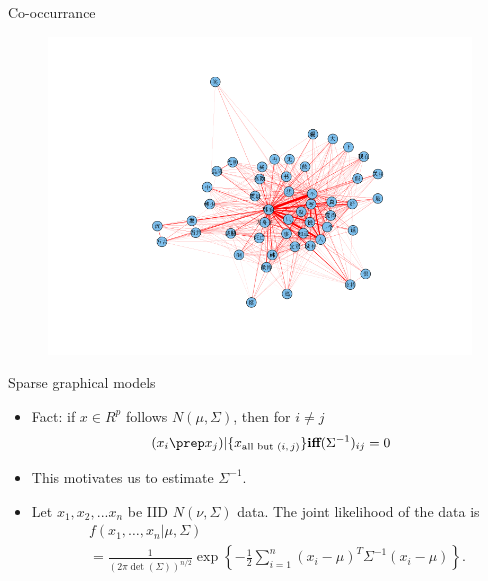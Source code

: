 \documentclass[12pt, trans]{beamer}
\newcommand{\1}[1]{{\mathbf 1}\left\{#1\right\}}        %
\def\lp{\left(}
\def\rp{\right)}
\begin{document}
\begin{frame}{Co-occurrance}

\begin{figure}
  \centering
  \includegraphics[height=0.9\textheight]{./../../coocurResults/cooccurNetwork.png} 
\end{figure}

\end{frame}

\begin{frame}[fragile]{Sparse graphical models}

\begin{itemize}[<+->]
\item Fact: if $x\in R^p$ follows $N(\mu,\Sigma)$, then for $i\ne j$
\begin{align*}
\label{eq: condIndpt}
(x_i \prep x_j )| \{x_{\text{all but $(i,j)$}}\} \textbf{iff} (\Sigma^{-1})_{ij}=0
\end{align*}
\item This motivates us to estimate $\Sigma^{-1}$.
\item Let $x_1,x_2,...x_n$ be IID $N(\nu,\Sigma)$ data. The joint likelihood of the data is
\begin{align*}
& f(x_1, \dots, x_n|\mu,\Sigma) 
\\&= \frac{1}{(2\pi \det\lp \Sigma\rp)^{n/2}}\exp\left\{ -\frac{1}{2} \sum_{i=1}^n(x_i-\mu)^T\Sigma^{-1}(x_i-\mu) \right\}.
\end{align*}

\end{itemize}

\end{frame}
\end{document}
